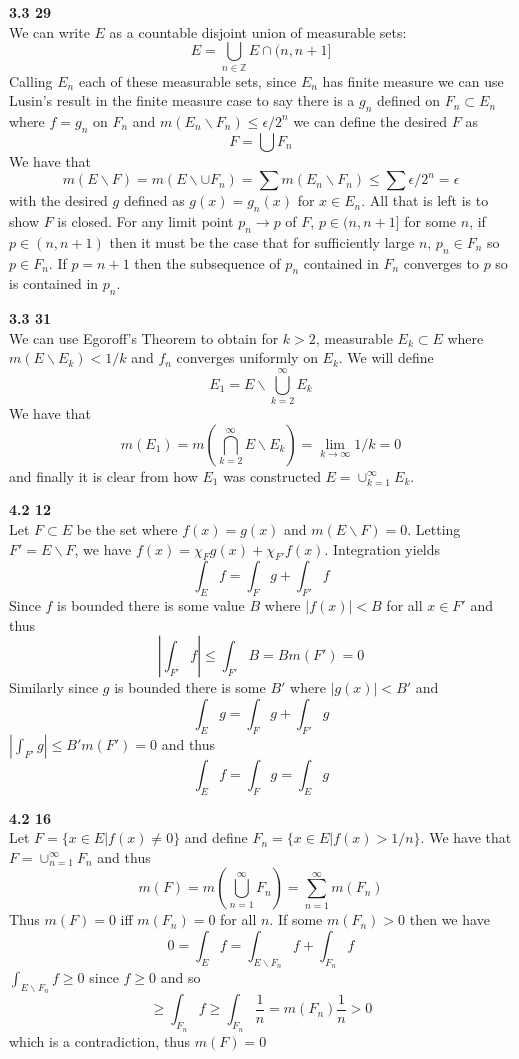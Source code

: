 \documentclass[12pt]{article}
\newenvironment{ques}[1]{\textbf{#1}\vspace{1 mm}\\ }{\bigskip}
\theoremstyle{definition}
\renewcommand{\l}{\left }
\renewcommand{\r}{\right }
\newcommand{\Z}{\mathbb Z}
\renewcommand{\-}{\backslash}
\begin{document}
\begin{ques}{3.3 29}
	We can write $E$ as a countable disjoint union of measurable sets:
	$$E = \bigcup_{n \in \Z} E \cap (n, n+1]$$
	Calling $E_n$ each of these measurable sets, since $E_n$ has finite measure
	we can use Lusin's result in the finite measure case to say there is a
	$g_n$ defined on $F_n \subset E_n$ where $f = g_n$ on $F_n$ and $m(E_n
	\backslash F_n) \leq \epsilon / 2^n$ we can define the desired $F$ as
	$$F = \bigcup F_n$$
	We have that
	$$m(E \backslash F) = m(E \backslash \cup F_n) = \sum m(E_n \backslash F_n)
	\leq \sum \epsilon / 2^n = \epsilon$$
	with the desired $g$ defined as $g(x) = g_n(x)$ for $x \in E_n$. All that
	is left is to show $F$ is closed. For any limit point
	$p_n \to p$ of $F$,  $p \in (n,n+1]$ for some $n$, if $p \in (n,n+1)$ then
	it must be the case that for sufficiently large $n$, $p_n \in F_n$ so $p
	\in F_n$. If $p = n+1$ then the subsequence of $p_n$ contained in $F_n$
	converges to $p$ so is contained in $p_n$. 
\end{ques}

\begin{ques}{3.3 31}
	We can use Egoroff's Theorem to obtain for $k > 2$, measurable $E_k \subset
	E$ where $m(E \backslash E_k) < 1/k$ and $f_n$ converges uniformly on
	$E_k$. We will define 
	$$E_1 = E \backslash \bigcup_{k=2}^\infty E_k$$
	We have that 
	$$m(E_1) = m\l(\bigcap_{k=2}^\infty E \backslash E_k\r) = \lim_{k \to
	\infty} 1/k = 0$$
	and finally it is clear from how $E_1$ was constructed $E =
	\cup_{k=1}^\infty E_k$. 
\end{ques}

\begin{ques}{4.2 12}
	Let $F \subset E$ be the set where $f(x) = g(x)$ and $m(E \backslash F) =
	0$. Letting $F' = E \backslash F$, we have $f(x) = \chi_F g(x) + \chi_{F'}
	f(x)$. Integration yields
	$$\int_E f = \int_F g + \int_{F'} f$$
	Since $f$ is bounded there is some value $B$ where $|f(x)| < B$ for all $x
	\in F'$ and thus
	$$\l|\int_{F'} f \r| \leq \int_{F'} B = Bm(F') = 0$$
	Similarly since $g$ is bounded there is some $B'$ where $|g(x)| < B'$ and
	$$\int_E g = \int_F g + \int_{F'} g $$
	$\l|\int_{F'} g \r| \leq B'm(F') = 0$ and thus
	$$\int_E f = \int_F g = \int_E g$$
\end{ques}

\begin{ques}{4.2 16}
	Let $F = \{x \in E| f(x) \neq 0\}$ and define $F_n = \{x \in E| f(x) >
	1/n\}$. We have that $F = \cup_{n=1}^\infty F_n$ and thus
	$$m\l(F\r) = m\l(\bigcup_{n=1}^\infty F_n\r) = \sum_{n=1}^\infty m(F_n)$$
	Thus $m(F)=0$ iff $m(F_n)=0$ for all $n$. If some $m(F_n) > 0$ then we have
	$$0 = \int_E f = \int_{E \backslash F_n} f + \int_{F_n} f$$
	$\int_{E \backslash F_n} f \geq 0 $ since $f \geq 0$ and so
	$$\geq \int_{F_n} f \geq \int_{F_n} \frac 1 n = m(F_n)\frac 1 n > 0$$
	which is a contradiction, thus $m(F) = 0$
\end{ques}
\end{document}
